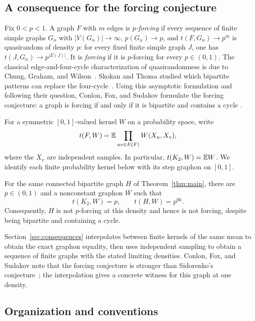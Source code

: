 \subsection*{A consequence for the forcing conjecture}

Fix \(0<p<1\). A graph \(F\) with \(m\) edges is \emph{\(p\)-forcing}
if every sequence of finite simple graphs \(G_n\) with
\(|V(G_n)|\to\infty\), \(p(G_n)\to p\), and
\(t(F,G_n)\to p^m\) is quasirandom of density \(p\): for every fixed
finite simple graph \(J\), one has
\(t(J,G_n)\to p^{|E(J)|}\). It is \emph{forcing} if it is
\(p\)-forcing for every \(p\in(0,1)\). The classical edge-and-four-cycle
characterization of quasirandomness is due to Chung, Graham, and
Wilson~\cite{chunggrahamwilson1989}. Skokan and Thoma studied which
bipartite patterns can replace the four-cycle~\cite{skokanthoma2004}.
Using this asymptotic formulation and following their question,
Conlon, Fox, and Sudakov formulate the forcing conjecture: a graph is forcing if and
only if it is bipartite and contains a cycle
\cite[Section~1, equation~(2) and Conjecture~2]{conlonfoxsudakov2010}.

For a symmetric \([0,1]\)-valued kernel \(W\) on a probability space,
write
\[
t(F,W)=\mathbb E\prod_{uv\in E(F)}W(X_u,X_v),
\]
where the \(X_v\) are independent samples. In particular,
\(t(K_2,W)=\mathbb E W\). We identify each finite probability kernel below
with its step graphon on \([0,1]\).

\begin{corollary}
\label{cor:forcing}
For the same connected bipartite graph \(H\) of
Theorem~\ref{thm:main}, there are \(p\in(0,1)\) and a nonconstant
graphon \(W\) such that
\[
t(K_2,W)=p,\qquad t(H,W)=p^{66}.
\]
Consequently, \(H\) is not \(p\)-forcing at this density and hence is
not forcing, despite being bipartite and containing a cycle.
\end{corollary}

Section~\ref{sec:consequences} interpolates between finite kernels of
the same mean to obtain the exact graphon equality, then uses independent
sampling to obtain a sequence of finite graphs with the stated limiting
densities.
Conlon, Fox, and Sudakov note that the forcing conjecture is stronger
than Sidorenko's conjecture~\cite[Section~1]{conlonfoxsudakov2010};
the interpolation gives a concrete witness for this graph at one density.

\subsection*{Organization and conventions}

